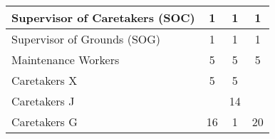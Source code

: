 \begin{tabular}{l|c|c|c|}
        \multicolumn{1}{|l|}{\cellcolor{ccfuschialight}Supervisor of Caretakers (SOC)} & 1                                                      & 1                                                                & 1                                                      \\ \hline
        \multicolumn{1}{|l|}{\cellcolor{ccfuschialight}Supervisor of Grounds (SOG)}    & 1                                                      & 1                                                                & 1                                                      \\ \hline
        \multicolumn{1}{|l|}{\cellcolor{ccfuschialight}Maintenance Workers}            & 5                                                      & 5                                                                & 5                                                       \\ \hline
        \multicolumn{1}{|l|}{\cellcolor{ccfuschialight}Caretakers X}                   & 5                                                      & 5                                                                &                                                       \\ \cline{1-3}
        \multicolumn{1}{|l|}{\cellcolor{ccfuschialight}Caretakers J\tnote{2}}                   &                                                       & 14                                                                &                                                         \\ \cline{1-1} \cline{3-3}
        \multicolumn{1}{|l|}{\cellcolor{ccfuschialight}Caretakers G}                   & \multirow{-2}{*}{16}                                                      & 1                                     & \multirow{-3}{*}{20 \tnote{3}}                           \\ \hline
        \end{tabular}
        
        